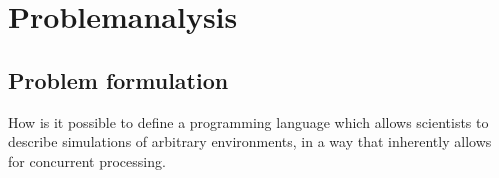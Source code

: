 \chapter{Problemanalysis}
\section{Problem formulation}
How is it possible to define a programming language which allows scientists to describe simulations of arbitrary environments, in a way that inherently allows for concurrent processing.